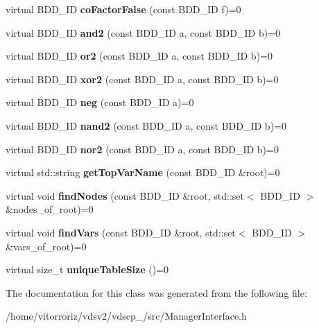 \begin{DoxyCompactItemize}
\item 
virtual B\+D\+D\+\_\+\+ID {\bfseries co\+Factor\+False} (const B\+D\+D\+\_\+\+ID f)=0\label{classClassProject_1_1ManagerInterface_a308c99661ad02f407d6f2b0af6230e80}

\item 
virtual B\+D\+D\+\_\+\+ID {\bfseries and2} (const B\+D\+D\+\_\+\+ID a, const B\+D\+D\+\_\+\+ID b)=0\label{classClassProject_1_1ManagerInterface_af914326d34a1ed42710f7b11e5baf010}

\item 
virtual B\+D\+D\+\_\+\+ID {\bfseries or2} (const B\+D\+D\+\_\+\+ID a, const B\+D\+D\+\_\+\+ID b)=0\label{classClassProject_1_1ManagerInterface_a8dbfde761b1e94d1f222b4d27f3c6fbc}

\item 
virtual B\+D\+D\+\_\+\+ID {\bfseries xor2} (const B\+D\+D\+\_\+\+ID a, const B\+D\+D\+\_\+\+ID b)=0\label{classClassProject_1_1ManagerInterface_a2b2c4948ef41ddb1036289cd07dac156}

\item 
virtual B\+D\+D\+\_\+\+ID {\bfseries neg} (const B\+D\+D\+\_\+\+ID a)=0\label{classClassProject_1_1ManagerInterface_a57d34af3121dcf5366d22ecf792f05a0}

\item 
virtual B\+D\+D\+\_\+\+ID {\bfseries nand2} (const B\+D\+D\+\_\+\+ID a, const B\+D\+D\+\_\+\+ID b)=0\label{classClassProject_1_1ManagerInterface_aaf6e357d680613e449d3ea958c9abba1}

\item 
virtual B\+D\+D\+\_\+\+ID {\bfseries nor2} (const B\+D\+D\+\_\+\+ID a, const B\+D\+D\+\_\+\+ID b)=0\label{classClassProject_1_1ManagerInterface_a312d9865eae2d6355e17855cba78bc78}

\item 
virtual std\+::string {\bfseries get\+Top\+Var\+Name} (const B\+D\+D\+\_\+\+ID \&root)=0\label{classClassProject_1_1ManagerInterface_afde45b2065361dfa6e61c1c7bc3fc1b4}

\item 
virtual void {\bfseries find\+Nodes} (const B\+D\+D\+\_\+\+ID \&root, std\+::set$<$ B\+D\+D\+\_\+\+ID $>$ \&nodes\+\_\+of\+\_\+root)=0\label{classClassProject_1_1ManagerInterface_ab460e331ffdb85d4128574b3aae72c1e}

\item 
virtual void {\bfseries find\+Vars} (const B\+D\+D\+\_\+\+ID \&root, std\+::set$<$ B\+D\+D\+\_\+\+ID $>$ \&vars\+\_\+of\+\_\+root)=0\label{classClassProject_1_1ManagerInterface_ab94feabca2125d334e542e502ae0186d}

\item 
virtual size\+\_\+t {\bfseries unique\+Table\+Size} ()=0\label{classClassProject_1_1ManagerInterface_a85cac80444b26e5b80eb96b9f1231c0e}

\end{DoxyCompactItemize}


The documentation for this class was generated from the following file\+:\begin{DoxyCompactItemize}
\item 
/home/vitorroriz/vdsv2/vdscp\+\_/src/Manager\+Interface.\+h\end{DoxyCompactItemize}

